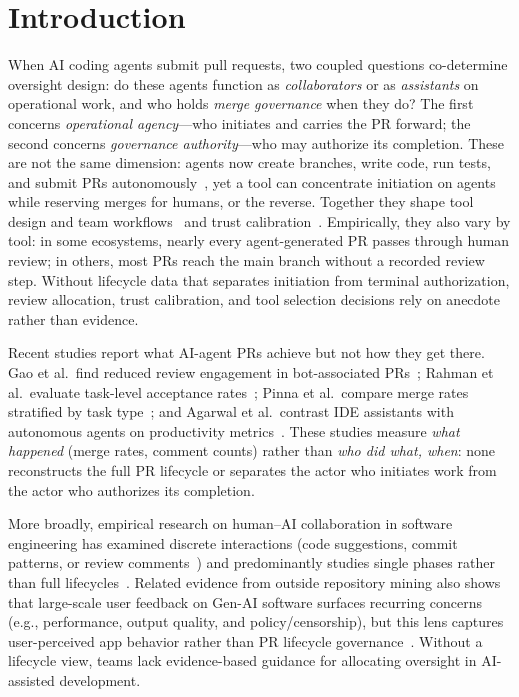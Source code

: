 \documentclass[sigconf]{acmart}
\begin{document}

\maketitle

\section{Introduction}

When AI coding agents submit pull requests, two coupled questions
co-determine oversight design: do these agents function as
\emph{collaborators} or as \emph{assistants} on operational work,
and who holds \emph{merge governance} when they do?
The first concerns \emph{operational agency}---who initiates and
carries the PR forward; the second concerns \emph{governance
authority}---who may authorize its completion.
These are not the same dimension: agents now create branches, write
code, run tests, and submit PRs
autonomously~\cite{li2025aiteammates}, yet a tool can concentrate
initiation on agents while reserving merges for humans, or the
reverse.
Together they shape tool design and team
workflows~\cite{raisch2021automation}
and trust calibration~\cite{okamura2020trust}.
Empirically, they also vary by tool: in some ecosystems, nearly every
agent-generated PR passes through human review; in others, most
PRs reach the main branch without a recorded review step.
Without lifecycle data that separates initiation from terminal
authorization, review allocation, trust calibration,
and tool selection decisions rely on anecdote rather than
evidence.

Recent studies report what AI-agent PRs achieve but not how
they get there.
Gao et al.\ find reduced review engagement in bot-associated
PRs~\cite{gao2026autopilot};
Rahman et al.\ evaluate task-level acceptance
rates~\cite{rahman2026tasklevel};
Pinna et al.\ compare merge rates stratified by task
type~\cite{pinna2026comparing};
and Agarwal et al.\ contrast IDE assistants with autonomous
agents on productivity metrics~\cite{agarwal2026ai}.
These studies measure \emph{what happened} (merge rates, comment
counts) rather than \emph{who did what, when}: none reconstructs
the full PR lifecycle or separates the actor who initiates work
from the actor who authorizes its completion.

More broadly, empirical research on human--AI collaboration in
software engineering has examined discrete
interactions (code suggestions, commit patterns, or review
comments~\cite{treude2025developers}) and predominantly studies
single phases rather than full
lifecycles~\cite{treude2012empirical}.
Related evidence from outside repository mining also shows that
large-scale user feedback on Gen-AI software surfaces recurring
concerns (e.g., performance, output quality, and policy/censorship),
but this lens captures user-perceived app behavior rather than PR
lifecycle governance~\cite{almulla2025understandingthechallenges}.
Without a lifecycle view, teams lack evidence-based guidance for
allocating oversight in AI-assisted development.
\end{document}
